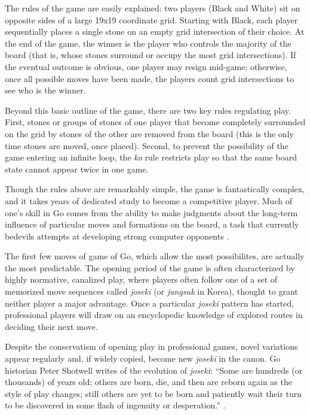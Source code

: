 \documentclass[reqno,12pt]{amsart}
\begin{document}
The rules of the game are easily explained: two players (Black and
White) sit on opposite sides of a large 19x19 coordinate grid. Starting
with Black, each player sequentially places a single stone on an empty
grid intersection of their choice. At the end of the game, the winner is
the player who controls the majority of the board (that is, whose stones
surround or occupy the most grid intersections). If the eventual outcome
is obvious, one player may resign mid-game; otherwise, once all possible
moves have been made, the players count grid intersections to see who is
the winner.

Beyond this basic outline of the game, there are two key rules
regulating play. First, stones or groups of stones of one player that
become completely surrounded on the grid by stones of the other are
removed from the board (this is the only time stones are moved, once
placed). Second, to prevent the possibility of the game entering an
infinite loop, the \emph{ko} rule restricts play so that the same board
state cannot appear twice in one game.

Though the rules above are remarkably simple, the game is fantastically
complex, and it takes years of dedicated study to become a competitive
player. Much of one's skill in Go comes from the ability to make
judgments about the long-term influence of particular moves and
formations on the board, a task that currently bedevils attempts at
developing strong computer opponents \citep{rimmel2010current}.

The first few moves of game of Go, which allow the most possibilites,
are actually the most predictable. The opening period of the game is
often characterized by highly normative, canalized play, where players
often follow one of a set of memorized move sequences called
\emph{joseki} (or \emph{jungsuk} in Korea), thought to grant neither
player a major advantage. Once a particular \emph{joseki} pattern has
started, professional players will draw on an encyclopedic knowledge of
explored routes in deciding their next move.

Despite the conservatism of opening play in professional games, novel
variations appear regularly and, if widely copied, become new
\emph{joseki} in the canon. Go historian Peter Shotwell writes of the
evolution of \emph{joseki}: ``Some are hundreds (or thousands) of years
old; others are born, die, and then are reborn again as the style of
play changes; still others are yet to be born and patiently wait their
turn to be discovered in some flash of ingenuity or desperation.''
\citep{shotwell2011go}.
\end{document}
